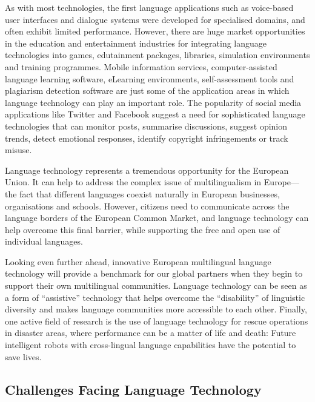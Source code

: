 \begin{multicols}{2}
As with most technologies, the first language applications such as voice-based user interfaces and dialogue systems were developed for specialised domains, and often exhibit limited performance. However, there are huge market opportunities in the education and entertainment industries for integrating language technologies into games, edutainment packages, libraries, simulation environments and training programmes. Mobile information services, computer-assisted language learning software, eLearning environments, self-assessment tools and plagiarism detection software are just some of the application areas in which language technology can play an important role. The popularity of social media applications like Twitter and Facebook suggest a need for sophisticated language technologies that can monitor posts, summarise discussions, suggest opinion trends, detect emotional responses, identify copyright infringements or track misuse.


Language technology represents a tremendous opportunity for the European Union. It can help to address the complex issue of multilingualism in Europe—the fact that different languages coexist naturally in European businesses, organisations and schools. However, citizens need to communicate across the language borders of the European Common Market, and language technology can help overcome this final barrier, while supporting the free and open use of individual languages. 

Looking even further ahead, innovative European multilingual language technology will provide a benchmark for our global partners when they begin to support their own multilingual communities. Language technology can be seen as a form of “assistive” technology that helps overcome the “disability” of linguistic diversity and makes language communities more accessible to each other. Finally, one active field of research is the use of language technology for rescue operations in disaster areas, where performance can be a matter of life and death: Future intelligent robots with cross-lingual language capabilities have the potential to save lives.
\vfill

\subsection{Challenges Facing Language Technology}


\end{multicols}
